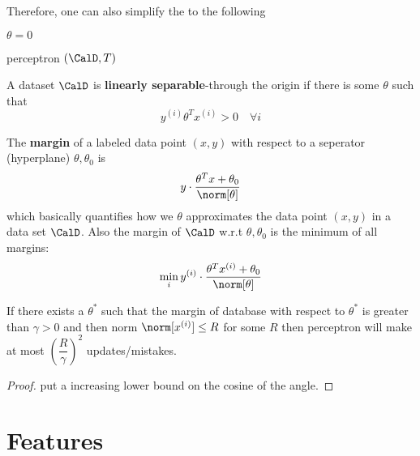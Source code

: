 Therefore, one can also simplify the  to the following

\begin{algorithm}[H]
    \DontPrintSemicolon
    $\theta = 0 $\;

    \Return{$\theta $}
    \caption{ perceptron $(\CalD , T )$}
\end{algorithm}
A dataset \(\CalD\) is \textbf{linearly separable}-through the origin if there is some \(\theta\) such that
\begin{equation*}
    y^{(i)} \theta^T x^{(i)} > 0 \quad \forall i
\end{equation*}

The \textbf{margin} of a labeled data point \((x,y)\) with respect to a seperator (hyperplane) \(\theta, \theta_0\) is
\begin{equation*}
    y \cdot \dfrac{\theta^T x +  \theta_0}{\norm[\theta]}
\end{equation*}
which basically quantifies how we \(\theta\) approximates the data point \((x,y)\) in a data set \(\CalD\). Also the margin of \(\CalD\) w.r.t \(\theta, \theta_0\) is
the minimum of all margins:
\begin{equation*}
    \min_i     y^{(i)} \cdot \dfrac{\theta^T x^{(i)} + \theta_0}{\norm[\theta]}
\end{equation*}

\begin{theorem} 
    If there exists a \(\theta^\ast\) such that the margin of database with respect to \(\theta^\ast\) is greater than \(\gamma > 0\) and then norm \(\norm[x^{(i)}] \leq R\) for some \(R\) then perceptron will make at most \(\left(\dfrac{R}{\gamma} \right)^2\) updates/mistakes.
\end{theorem}

\begin{proof}
    put a increasing lower bound on the cosine of the angle.
\end{proof}

\section{Features}
